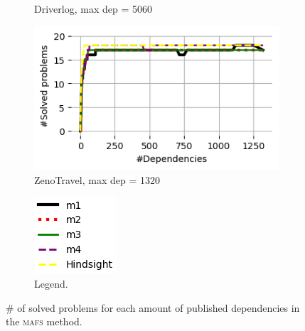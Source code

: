 \documentclass{article}
\newcommand{\mafs}{\textsc {mafs}\xspace}
\newcommand{\commentout}[1]{}
\theoremstyle{remark}
\begin{document}
\begin{figure}[t!]
\begin{subfigure}[b]{0.3\textwidth}
  \caption{Driverlog, max dep = 5060}
  \label{fig:DriverlogMAFS}
\end{subfigure}\hspace{1em}
\begin{subfigure}[b]{0.3\textwidth}
\centering
  \includegraphics[width=1\linewidth]{Results_graphs/MAFS/coverage_MAFS_ZenoTravel}
  \caption{ZenoTravel, max dep = 1320}
  \label{fig:ZenoTravelMAFS}
\end{subfigure}\hspace{1em}
\begin{subfigure}[b]{0.5\textwidth}
\centering
  \includegraphics[scale=1]{Results_graphs/coverage_legend_without_random}
  \caption{Legend.}
  \label{fig:LegendMAFS}
\end{subfigure}\hspace{1em}
\caption{\# of solved problems for each amount of published dependencies in the \mafs method.
\commentout{Graphs truncated after all methods solve all problems.}}
\label{fig:CoverageMAFS}
\end{figure}
\end{document}
